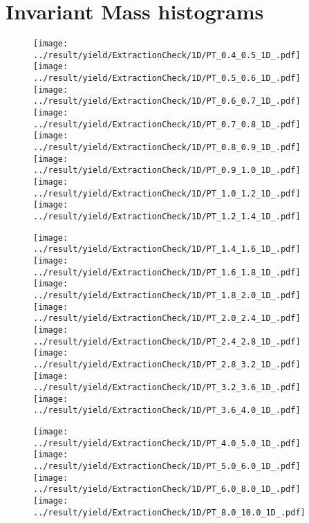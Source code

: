 \section{Invariant Mass histograms}
\label{sec:InvMass_Histo}

\begin{figure}[!h]
	\centering
		\texttt{[image: ../result/yield/ExtractionCheck/1D/PT\_0.4\_0.5\_1D\_.pdf]}
		\texttt{[image: ../result/yield/ExtractionCheck/1D/PT\_0.5\_0.6\_1D\_.pdf]}\\
		\texttt{[image: ../result/yield/ExtractionCheck/1D/PT\_0.6\_0.7\_1D\_.pdf]}
		\texttt{[image: ../result/yield/ExtractionCheck/1D/PT\_0.7\_0.8\_1D\_.pdf]}\\		
		\texttt{[image: ../result/yield/ExtractionCheck/1D/PT\_0.8\_0.9\_1D\_.pdf]}
		\texttt{[image: ../result/yield/ExtractionCheck/1D/PT\_0.9\_1.0\_1D\_.pdf]}\\
		\texttt{[image: ../result/yield/ExtractionCheck/1D/PT\_1.0\_1.2\_1D\_.pdf]}
		\texttt{[image: ../result/yield/ExtractionCheck/1D/PT\_1.2\_1.4\_1D\_.pdf]}
\end{figure}


\begin{figure}[!h]
	\centering
		\texttt{[image: ../result/yield/ExtractionCheck/1D/PT\_1.4\_1.6\_1D\_.pdf]}
		\texttt{[image: ../result/yield/ExtractionCheck/1D/PT\_1.6\_1.8\_1D\_.pdf]}\\
		\texttt{[image: ../result/yield/ExtractionCheck/1D/PT\_1.8\_2.0\_1D\_.pdf]}
		\texttt{[image: ../result/yield/ExtractionCheck/1D/PT\_2.0\_2.4\_1D\_.pdf]}\\
		\texttt{[image: ../result/yield/ExtractionCheck/1D/PT\_2.4\_2.8\_1D\_.pdf]}
		\texttt{[image: ../result/yield/ExtractionCheck/1D/PT\_2.8\_3.2\_1D\_.pdf]}\\
		\texttt{[image: ../result/yield/ExtractionCheck/1D/PT\_3.2\_3.6\_1D\_.pdf]}
		\texttt{[image: ../result/yield/ExtractionCheck/1D/PT\_3.6\_4.0\_1D\_.pdf]}
\end{figure}

\begin{figure}[!h]
	\centering
		\texttt{[image: ../result/yield/ExtractionCheck/1D/PT\_4.0\_5.0\_1D\_.pdf]}
		\texttt{[image: ../result/yield/ExtractionCheck/1D/PT\_5.0\_6.0\_1D\_.pdf]}\\
		\texttt{[image: ../result/yield/ExtractionCheck/1D/PT\_6.0\_8.0\_1D\_.pdf]}
		\texttt{[image: ../result/yield/ExtractionCheck/1D/PT\_8.0\_10.0\_1D\_.pdf]}
\end{figure}